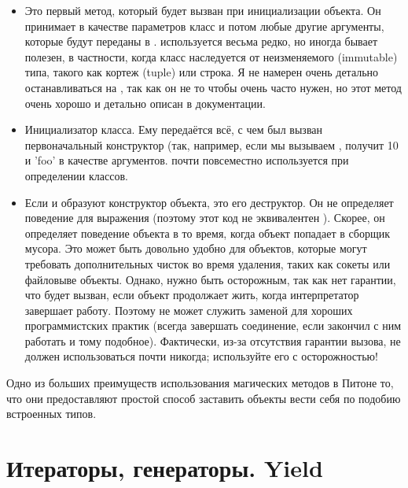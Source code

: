 \begin{itemize}
	\item \pyth{__new__(cls, [...)}
Это первый метод, который будет вызван при инициализации объекта. Он принимает в качестве параметров класс и потом любые другие аргументы, которые будут переданы в .  используется весьма редко, но иногда бывает полезен, в частности, когда класс наследуется от неизменяемого (immutable) типа, такого как кортеж (tuple) или строка. Я не намерен очень детально останавливаться на , так как он не то чтобы очень часто нужен, но этот метод очень хорошо и детально описан в документации.

	\item \pyth{__init__(self, [...)}
Инициализатор класса. Ему передаётся всё, с чем был вызван первоначальный конструктор (так, например, если мы вызываем ,  получит 10 и 'foo' в качестве аргументов.  почти повсеместно используется при определении классов.

	\item {}
Если  и  образуют конструктор объекта,  это его деструктор. Он не определяет поведение для выражения  (поэтому этот код не эквивалентен ). Скорее, он определяет поведение объекта в то время, когда объект попадает в сборщик мусора. Это может быть довольно удобно для объектов, которые могут требовать дополнительных чисток во время удаления, таких как сокеты или файловыве объекты. Однако, нужно быть осторожным, так как нет гарантии, что  будет вызван, если объект продолжает жить, когда интерпретатор завершает работу. Поэтому  не может служить заменой для хороших программистских практик (всегда завершать соединение, если закончил с ним работать и тому подобное). Фактически, из-за отсутствия гарантии вызова,  не должен использоваться почти никогда; используйте его с осторожностью!

\end{itemize}

Одно из больших преимуществ использования магических методов в Питоне то, что они предоставляют простой способ заставить объекты вести себя по подобию встроенных типов. 

\section{Итераторы, генераторы. Yield}


